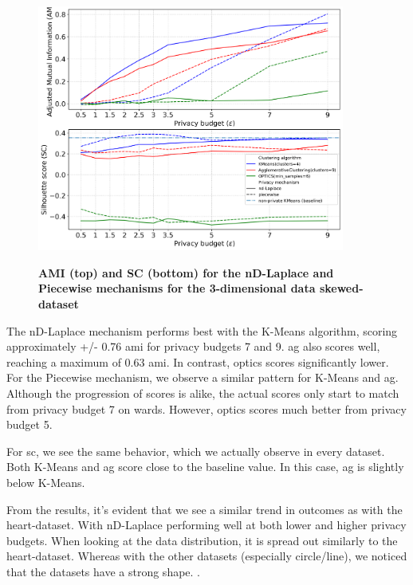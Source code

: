 \begin{figure}[H]
  \centering
  \caption{\textbf{AMI (top) and SC (bottom) for the nD-Laplace and Piecewise mechanisms for the 3-dimensional data skewed-dataset}}
  \includegraphics[width=0.9\textwidth]{Results/nd-laplace/nd-Laplace/skewed-dataset/ami-and-sc_3_dimensions.png}
  \label{fig:validation-skewed-dataset_comparison_3d-laplace}
\end{figure}
The nD-Laplace mechanism performs best with the K-Means algorithm, scoring approximately +/- 0.76 \gls{ami} for privacy budgets 7 and 9. \gls{ag} also scores well, reaching a maximum of 0.63 \gls{ami}. In contrast, \gls{optics} scores significantly lower.
For the Piecewise mechanism, we observe a similar pattern for K-Means and \gls{ag}. Although the progression of scores is alike, the actual scores only start to match from privacy budget 7 on wards. However, \gls{optics} scores much better from privacy budget 5.

For \gls{sc}, we see the same behavior, which we actually observe in every dataset. Both K-Means and \gls{ag} score close to the baseline value. In this case, \gls{ag} is slightly below K-Means.

From the results, it's evident that we see a similar trend in outcomes as with the heart-dataset. With nD-Laplace performing well at both lower and higher privacy budgets. When looking at the data distribution, it is spread out similarly to the heart-dataset. Whereas with the other datasets (especially circle/line), we noticed that the datasets have a strong shape.
.

\newpage
